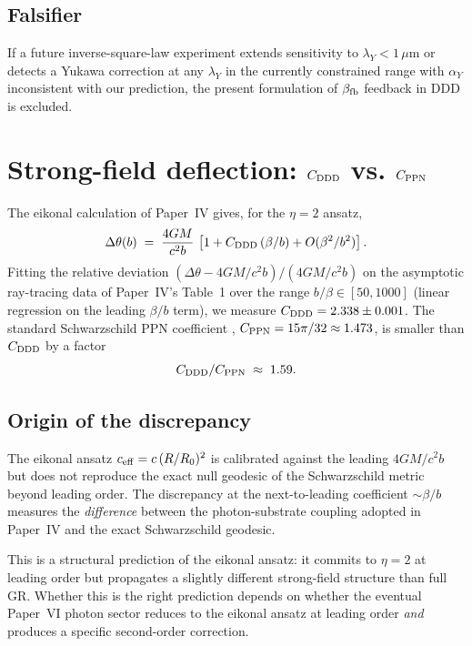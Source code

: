 \documentclass[11pt,a4paper]{article}
\begin{document}
\subsection{Falsifier}

If a future inverse-square-law experiment extends sensitivity to
$\lambda_Y < 1\,\mu\text{m}$ or detects a Yukawa correction at any
$\lambda_Y$ in the currently constrained range with $\alpha_Y$
inconsistent with our prediction, the present formulation of
$\beta_{\rm fb}$ feedback in DDD is excluded.

\section{Strong-field deflection: $C_{\rm DDD}$ vs. $C_{\rm PPN}$}
\label{sec:strong-deflection}

The eikonal calculation of Paper~IV gives, for the $\eta = 2$ ansatz,
\[
\Delta\theta(b) \;=\; \frac{4GM}{c^2 b}\,
\left[1 + C_{\rm DDD}\,(\beta/b) + O(\beta^2/b^2)\right].
\]
Fitting the relative deviation $(\Delta\theta - 4GM/c^2 b)/(4GM/c^2 b)$
on the asymptotic ray-tracing data of Paper~IV's Table~1 over the
range $b/\beta \in [50, 1000]$ (linear regression on the leading
$\beta/b$ term), we measure $C_{\rm DDD} = 2.338 \pm 0.001$. The
standard Schwarzschild PPN coefficient
\cite{will2014}, $C_{\rm PPN} = 15\pi/32 \approx 1.473$, is smaller
than $C_{\rm DDD}$ by a factor
\[
C_{\rm DDD} / C_{\rm PPN} \;\approx\; 1.59.
\]

\subsection{Origin of the discrepancy}

The eikonal ansatz $c_{\rm eff} = c\,(R/R_0)^2$ is calibrated against
the leading $4GM/c^2 b$ but does not reproduce the exact null geodesic
of the Schwarzschild metric beyond leading order. The discrepancy at
the next-to-leading coefficient $\sim \beta/b$ measures the
\emph{difference} between the photon-substrate coupling adopted in
Paper~IV and the exact Schwarzschild geodesic.

This is a structural prediction of the eikonal ansatz: it commits to
$\eta = 2$ at leading order but propagates a slightly different
strong-field structure than full GR. Whether this is the right
prediction depends on whether the eventual Paper~VI photon sector
reduces to the eikonal ansatz at leading order \emph{and} produces a
specific second-order correction.
\end{document}
